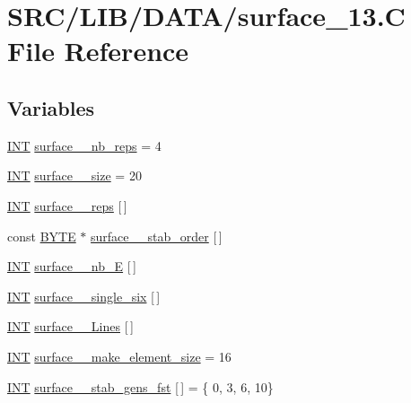 \hypertarget{surface__13_8_c}{}\section{S\+R\+C/\+L\+I\+B/\+D\+A\+T\+A/surface\+\_\+13.C File Reference}
\label{surface__13_8_c}
\subsection*{Variables}
\begin{DoxyCompactItemize}
\item 
\mbox{\hyperlink{galois_8h_a09fddde158a3a20bd2dcadb609de11dc}{I\+NT}} \mbox{\hyperlink{surface__13_8_c_a1377196aec145e9b08d49eeac089c0f6}{surface\+\_\+\_\+nb\+\_\+reps}} = 4
\item 
\mbox{\hyperlink{galois_8h_a09fddde158a3a20bd2dcadb609de11dc}{I\+NT}} \mbox{\hyperlink{surface__13_8_c_a1e29bb83475a67c0c1b0673aa1104855}{surface\+\_\+\_\+size}} = 20
\item 
\mbox{\hyperlink{galois_8h_a09fddde158a3a20bd2dcadb609de11dc}{I\+NT}} \mbox{\hyperlink{surface__13_8_c_ae0ff5e6967163f9e4383a0837f5ec99f}{surface\+\_\+\_\+reps}} \mbox{[}$\,$\mbox{]}
\item 
const \mbox{\hyperlink{galois_8h_ab6cc7b4aeb6ea31aba2b3fbfc83ff5e6}{B\+Y\+TE}} $\ast$ \mbox{\hyperlink{surface__13_8_c_a696cac8223417efb171d0cbb4e1b9d18}{surface\+\_\+\_\+stab\+\_\+order}} \mbox{[}$\,$\mbox{]}
\item 
\mbox{\hyperlink{galois_8h_a09fddde158a3a20bd2dcadb609de11dc}{I\+NT}} \mbox{\hyperlink{surface__13_8_c_a89d4819af1ce82ebdf35efd07d4f45c4}{surface\+\_\+\_\+nb\+\_\+E}} \mbox{[}$\,$\mbox{]}
\item 
\mbox{\hyperlink{galois_8h_a09fddde158a3a20bd2dcadb609de11dc}{I\+NT}} \mbox{\hyperlink{surface__13_8_c_a3696484a18cb791e08d2fb8d8cd6f73d}{surface\+\_\+\_\+single\+\_\+six}} \mbox{[}$\,$\mbox{]}
\item 
\mbox{\hyperlink{galois_8h_a09fddde158a3a20bd2dcadb609de11dc}{I\+NT}} \mbox{\hyperlink{surface__13_8_c_a03794e22872bf9a20f958ad692ab76bf}{surface\+\_\+\_\+\+Lines}} \mbox{[}$\,$\mbox{]}
\item 
\mbox{\hyperlink{galois_8h_a09fddde158a3a20bd2dcadb609de11dc}{I\+NT}} \mbox{\hyperlink{surface__13_8_c_ae7518b990917658273c52d41d611f2e6}{surface\+\_\+\_\+make\+\_\+element\+\_\+size}} = 16
\item 
\mbox{\hyperlink{galois_8h_a09fddde158a3a20bd2dcadb609de11dc}{I\+NT}} \mbox{\hyperlink{surface__13_8_c_ab85ba6652615fb0c8accaff8956ee8b7}{surface\+\_\+\_\+stab\+\_\+gens\+\_\+fst}} \mbox{[}$\,$\mbox{]} = \{ 0, 3, 6, 10\}

\end{DoxyCompactItemize}
